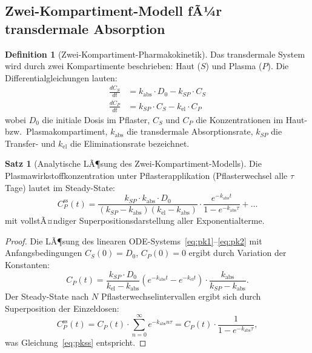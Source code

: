 ﻿\documentclass[a4paper,12pt]{article}
\theoremstyle{definition}
\newtheorem{definition}{Definition}
\newtheorem{satz}{Satz}
\begin{document}
\subsection{Zwei-Kompartiment-Modell fÃ¼r transdermale Absorption}

\begin{definition}[Zwei-Kompartiment-Pharmakokinetik]
Das transdermale System wird durch zwei Kompartimente beschrieben: Haut ($S$) und Plasma ($P$).
Die Differentialgleichungen lauten:
\begin{align}
  \frac{dC_S}{dt} &= k_{\mathrm{abs}} \cdot D_0 - k_{SP} \cdot C_S \label{eq:pk1}\\
  \frac{dC_P}{dt} &= k_{SP} \cdot C_S - k_{\mathrm{el}} \cdot C_P \label{eq:pk2}
\end{align}
wobei $D_0$ die initiale Dosis im Pflaster, $C_S$ und $C_P$ die Konzentrationen im Haut- bzw.\ Plasmakompartiment, $k_{\mathrm{abs}}$ die transdermale Absorptionsrate, $k_{SP}$ die Transfer- und $k_{\mathrm{el}}$ die Eliminationsrate bezeichnet.
\end{definition}

\begin{satz}[Analytische LÃ¶sung des Zwei-Kompartiment-Modells]
Die Plasmawirkstoffkonzentration unter Pflasterapplikation (Pflasterwechsel alle $\tau$ Tage) lautet im Steady-State:
\begin{equation}
  C_P^{\mathrm{ss}}(t) = \frac{k_{SP} \cdot k_{\mathrm{abs}} \cdot D_0}{(k_{SP} - k_{\mathrm{abs}})(k_{\mathrm{el}} - k_{\mathrm{abs}})} \cdot
  \frac{e^{-k_{\mathrm{abs}} t}}{1 - e^{-k_{\mathrm{abs}}\tau}} + \ldots
  \label{eq:pkss}
\end{equation}
mit vollstÃ¤ndiger Superpositionsdarstellung aller Exponentialterme.
\end{satz}

\begin{proof}
Die LÃ¶sung des linearen ODE-Systems~\eqref{eq:pk1}--\eqref{eq:pk2} mit Anfangsbedingungen $C_S(0) = D_0$, $C_P(0) = 0$ ergibt durch Variation der Konstanten:
\[
  C_P(t) = \frac{k_{SP} \cdot D_0}{k_{\mathrm{el}} - k_{\mathrm{abs}}} \left( e^{-k_{\mathrm{abs}}t} - e^{-k_{\mathrm{el}}t} \right) \cdot \frac{k_{\mathrm{abs}}}{k_{SP} - k_{\mathrm{abs}}}.
\]
Der Steady-State nach $N$ Pflasterwechselintervallen ergibt sich durch Superposition der Einzeldosen:
\[
  C_P^{\mathrm{ss}}(t) = C_P(t) \cdot \sum_{n=0}^{\infty} e^{-k_{\mathrm{abs}} n \tau} = C_P(t) \cdot \frac{1}{1 - e^{-k_{\mathrm{abs}}\tau}},
\]
was Gleichung~\eqref{eq:pkss} entspricht. 
\end{proof}
\end{document}
